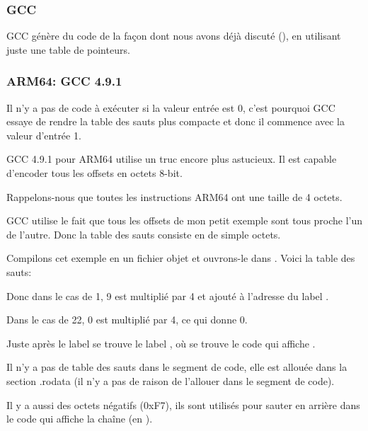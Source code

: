 \subsubsection{GCC}

GCC génère du code de la façon dont nous avons déjà discuté (),
en utilisant juste une table de pointeurs.

\subsubsection{ARM64: GCC 4.9.1 \Optimizing}

Il n'y a pas de code à exécuter si la valeur entrée est 0, c'est pourquoi GCC
essaye de rendre la table des sauts plus compacte et donc il commence avec la
valeur d'entrée 1.

GCC 4.9.1 pour ARM64 utilise un truc encore plus astucieux.
Il est capable d'encoder tous les offsets en octets 8-bit.

Rappelons-nous que toutes les instructions ARM64 ont une taille de 4 octets.

GCC utilise le fait que tous les offsets de mon petit exemple sont tous proche l'un
de l'autre. Donc la table des sauts consiste en de simple octets.



Compilons cet exemple en un fichier objet et ouvrons-le dans \IDA. Voici la table
des sauts:



Donc dans le cas de 1, 9 est multiplié par 4 et ajouté à l'adresse
du label .

Dans le cas de 22, 0 est multiplié par 4, ce qui donne 0.

Juste après le label  se trouve le label , où se trouve le code
qui affiche .

Il n'y a pas de table des sauts dans le segment de code, elle est allouée dans
la section .rodata (il n'y a pas de raison de l'allouer dans le segment de code).

Il y a aussi des octets négatifs (0xF7), ils sont utilisés pour sauter en arrière
dans le code qui affiche la chaîne  (en ).

